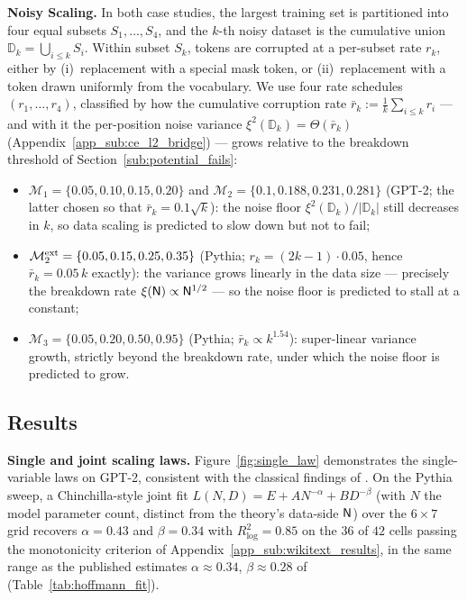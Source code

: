\documentclass[11pt]{article}
\let\citet\citep
\theoremstyle{plain}
\begin{document}
{\bf Noisy Scaling.} In both case studies, the largest training set is partitioned into four equal subsets $S_1, \dots, S_4$, and the $k$-th noisy dataset is the cumulative union $\mathbb{D}_k = \bigcup_{i\le k} S_i$. Within subset $S_k$, tokens are corrupted at a per-subset rate $r_k$, either by (i)~replacement with a special mask token, or (ii)~replacement with a token drawn uniformly from the vocabulary. We use four rate schedules $(r_1, \dots, r_4)$, classified by how the cumulative corruption rate $\bar{r}_k := \frac{1}{k}\sum_{i\le k} r_i$ --- and with it the per-position noise variance $\xi^2(\mathbb{D}_k) = \Theta(\bar r_k)$ (Appendix~\ref{app_sub:ce_l2_bridge}) --- grows relative to the breakdown threshold of Section~\ref{sub:potential_fails}:
\begin{itemize}
    \item $\mathcal{M}_1 = \{0.05, 0.10, 0.15, 0.20\}$ and $\mathcal{M}_2 = \{0.1, 0.188, 0.231, 0.281\}$ (GPT-2; the latter chosen so that $\bar r_k = 0.1\sqrt{k}$): the noise floor $\xi^2(\mathbb{D}_k)/|\mathbb{D}_k|$ still decreases in $k$, so data scaling is predicted to slow down but not to fail;
    \item $\mathcal{M}_2^{\rm ext} = \{0.05, 0.15, 0.25, 0.35\}$ (Pythia; $r_k = (2k-1)\cdot 0.05$, hence $\bar r_k = 0.05\,k$ exactly): the variance grows linearly in the data size --- precisely the breakdown rate $\xi({\sf N})\propto{\sf N}^{1/2}$ --- so the noise floor is predicted to stall at a constant;
    \item $\mathcal{M}_3 = \{0.05, 0.20, 0.50, 0.95\}$ (Pythia; $\bar r_k \propto k^{1.54}$): super-linear variance growth, strictly beyond the breakdown rate, under which the noise floor is predicted to grow.
\end{itemize}

\subsection{Results}\label{sub:exp_ret}

{\bf Single and joint scaling laws.} Figure~\ref{fig:single_law} demonstrates the single-variable laws on GPT-2, consistent with the classical findings of \citet{kmh+20}. On the Pythia sweep, a Chinchilla-style joint fit $L(N,D)=E+A N^{-\alpha}+B D^{-\beta}$ (with $N$ the model parameter count, distinct from the theory's data-side ${\sf N}$) over the $6\times 7$ grid recovers $\alpha=0.43$ and $\beta=0.34$ with $R^2_{\log}=0.85$ on the $36$ of $42$ cells passing the monotonicity criterion of Appendix~\ref{app_sub:wikitext_results}, in the same range as the published estimates $\alpha\approx 0.34$, $\beta\approx 0.28$ of \citet{hbm+22} (Table~\ref{tab:hoffmann_fit}).
\end{document}
